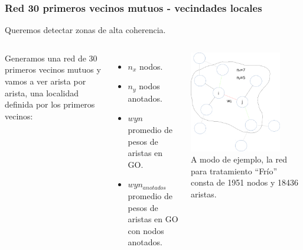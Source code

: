 \documentclass[serif,9pt, t]{beamer}
\newcommand\Fontvi{\fontsize{7}{7.2}\selectfont}
\begin{document}
\begin{frame}\frametitle{Red 30 primeros vecinos mutuos - vecindades locales} 
\centering
Queremos detectar zonas de alta coherencia.\\
\bigskip
\begin{columns}[T]
	 Generamos una red de 30 primeros vecinos mutuos y vamos a ver arista por arista, una localidad definida por los primeros vecinos:
	\bigskip
	\begin{itemize}
	\item $n_x$ nodos.
	\item $n_y$ nodos anotados.
	\item $wyn$ promedio de pesos de aristas en GO.
	\item $wyn_{anotados}$ promedio de pesos de aristas en GO con nodos anotados.	
	\end{itemize}
    \centering
    \bigskip
    \includegraphics[width=0.8\textwidth]{vecindario_local.pdf}\\
    \bigskip
    \Fontvi
	A modo de ejemplo, la red para tratamiento ``Frío'' consta de 1951 nodos y 18436 aristas.
\end{columns}
\end{frame}
\end{document}
